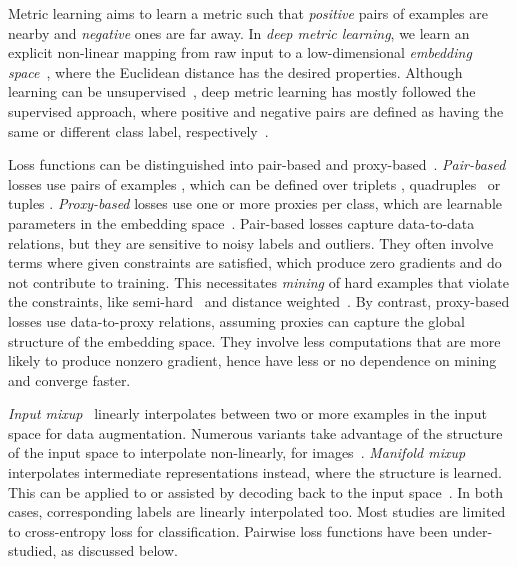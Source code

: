\documentclass{article}
\makeatletter
\renewcommand\paragraph{\@startsection{paragraph}{4}{\z@}{1ex}{-1em}{\normalfont\normalsize\bfseries}}
\makeatother
\begin{document}
\paragraph{Metric learning}

Metric learning aims to learn a metric such that \emph{positive} pairs of examples are nearby and \emph{negative} ones are far away.
In \emph{deep metric learning}, we learn an explicit non-linear mapping from raw input to a low-dimensional \emph{embedding space}~\citep{oh2016deep}, where the Euclidean distance has the desired properties. Although learning can be unsupervised~\citep{hadsell2006dimensionality}, deep metric learning has mostly followed the supervised approach, where positive and negative pairs are defined as having the same or different class label, respectively~\citep{xing2002distance}.

Loss functions can be distinguished into pair-based and proxy-based~\citep{musgrave2020metric}. \emph{Pair-based} losses use pairs of examples \citep{sampling_matters, hadsell2006dimensionality}, which can be defined over triplets \citep{WSL+14, facenet, weinberger2009distance, hermans2017defense}, quadruples~\citep{quadruplet} or tuples \citep{sohn2016improved, oh2016deep, wang2019multi}. \emph{Proxy-based} losses use one or more proxies per class, which are learnable parameters in the embedding space~\citep{movshovitz2017no, qian2019softtriple, kim2020proxy, teh2020proxynca++, zhu2020fewer}. Pair-based losses capture data-to-data relations, but they are sensitive to noisy labels and outliers. They often involve terms where given constraints are satisfied, which produce zero gradients and do not contribute to training. This necessitates \emph{mining} of hard examples that violate the constraints, like semi-hard~\citep{facenet} and distance weighted~\citep{sampling_matters}. By contrast, proxy-based losses use data-to-proxy relations, assuming proxies can capture the global structure of the embedding space. They involve less computations that are more likely to produce nonzero gradient, hence have less or no dependence on mining and converge faster.


\paragraph{Mixup}

\emph{Input mixup}~\citep{zhang2018mixup} linearly interpolates between two or more examples in the input space for data augmentation. Numerous variants take advantage of the structure of the input space to interpolate non-linearly, \eg for images~\citep{yun2019cutmix, kim2020puzzle, kim2021co, hendrycks2019augmix,devries2017improved, qin2020resizemix, uddin2020saliencymix}. \emph{Manifold mixup}~\citep{verma2019manifold} interpolates intermediate representations instead, where the structure is learned. This can be applied to or assisted by decoding back to the input space~\citep{berthelot2018understanding,LZK+18,beckham2019adversarial,zhu2020automix,venkataramanan2021alignmix}. In both cases, corresponding labels are linearly interpolated too. Most studies are limited to cross-entropy loss for classification. Pairwise loss functions have been under-studied, as discussed below.
\end{document}
